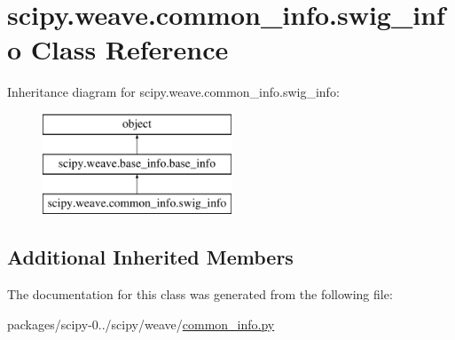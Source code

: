 \hypertarget{classscipy_1_1weave_1_1common__info_1_1swig__info}{}\section{scipy.\+weave.\+common\+\_\+info.\+swig\+\_\+info Class Reference}
\label{classscipy_1_1weave_1_1common__info_1_1swig__info}
Inheritance diagram for scipy.\+weave.\+common\+\_\+info.\+swig\+\_\+info\+:\begin{figure}[H]
\begin{center}
\leavevmode
\includegraphics[height=3.000000cm]{classscipy_1_1weave_1_1common__info_1_1swig__info}
\end{center}
\end{figure}
\subsection*{Additional Inherited Members}


The documentation for this class was generated from the following file\+:\begin{DoxyCompactItemize}
\item 
packages/scipy-\/0../scipy/weave/\hyperlink{common__info_8py}{common\+\_\+info.\+py}\end{DoxyCompactItemize}
